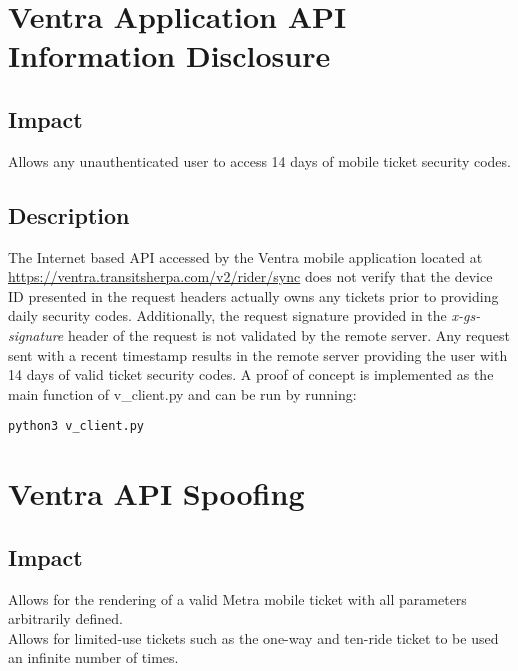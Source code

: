 \documentclass[12pt,conference]{IEEEtran}
\begin{document}
\section{Ventra Application API Information Disclosure}

\subsection{Impact}
Allows any unauthenticated user to access 14 days of mobile ticket security codes.

\subsection{Description}
The Internet based API accessed by the Ventra mobile application located at \url{https://ventra.transitsherpa.com/v2/rider/sync} does not verify that the device ID presented in the request headers actually owns any tickets prior to providing daily security codes. Additionally, the request signature provided in the \emph{x-gs-signature} header of the request is not validated by the remote server. Any request sent with a recent timestamp results in the remote server providing the user with 14 days of valid ticket security codes. A proof of concept is implemented as the main function of v\_client.py and can be run by running:
\begin{lstlisting}
python3 v_client.py
\end{lstlisting}

\section{Ventra API Spoofing}

\subsection{Impact}
Allows for the rendering of a valid Metra mobile ticket with all parameters arbitrarily defined.\\
Allows for limited-use tickets such as the one-way and ten-ride ticket to be used an infinite number of times.
\end{document}
